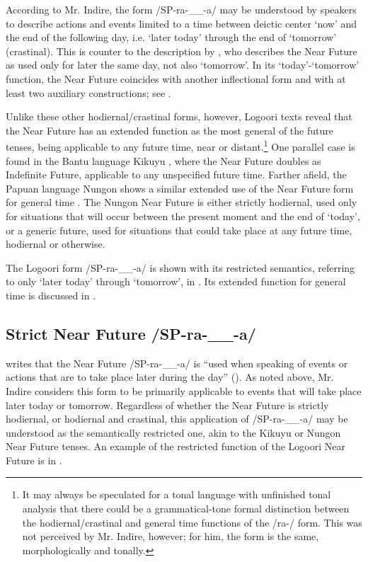 \documentclass[output=paper]{langsci/langscibook}
\begin{document}
According to Mr. Indire, the form /SP-ra-\_\_-a/ may be understood by speakers to describe actions and events limited to a time between deictic center ‘now’ and the end of the following day, i.e. ‘later today’ through the end of ‘tomorrow’ (crastinal). This is counter to the description by \citet[174]{Leung1991}, who describes the Near Future as used only for later the same day, not also ‘tomorrow’. In its ‘today’-‘tomorrow’ function, the Near Future coincides with another inflectional form and with at least two auxiliary constructions; see .

Unlike these other hodiernal/crastinal forms, however, Logoori texts reveal that the Near Future has an extended function as the most general of the future tenses, being applicable to any future time, near or distant.\footnote{It may always be speculated for a tonal language with unfinished tonal analysis that there could be a grammatical-tone formal distinction between the hodiernal/crastinal and general time functions of the /ra-/ form. This was not perceived by Mr. Indire, however; for him, the form is the same, morphologically and tonally.} One parallel case is found in the Bantu language Kikuyu \citep[19]{Johnson1977}, where the Near Future doubles as Indefinite Future, applicable to any unspecified future time. Farther afield, the Papuan language Nungon shows a similar extended use of the Near Future form for general time \citep{Sarvasy2014}. The Nungon Near Future is either strictly hodiernal, used only for situations that will occur between the present moment and the end of ‘today’, or a generic future, used for situations that could take place at any future time, hodiernal or otherwise. 

The Logoori form /SP-ra-\_\_-a/ is shown with its restricted semantics, referring to only ‘later today’ through ‘tomorrow’, in . Its extended function for general time is discussed in .

\subsection{Strict Near Future /SP-ra-\_\_-a/}
\label{sec:sarvasy:3.1}

\citeauthor{Leung1991} writes that the Near Future /SP-ra-\_\_-a/ is “used when speaking of events or actions that are to take place later during the day” (\citeyear[174]{Leung1991}). As noted above, Mr. Indire considers this form to be primarily applicable to events that will take place later today or tomorrow. Regardless of whether the Near Future is strictly hodiernal, or hodiernal and crastinal, this application of /SP-ra-\_\_-a/ may be understood as the semantically restricted one, akin to the Kikuyu or Nungon Near Future tenses. An example of the restricted function of the Logoori Near Future is in . 
\end{document}
